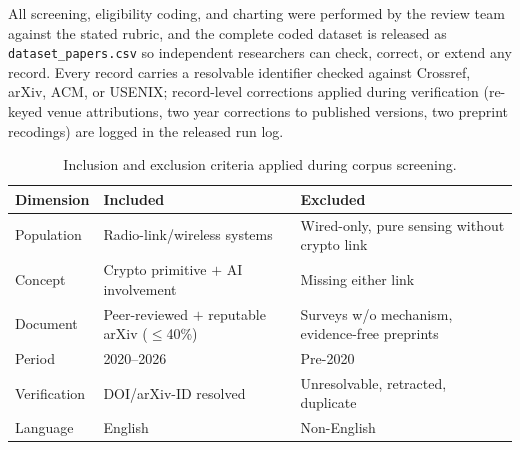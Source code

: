 \documentclass[10.5pt,compsoc,winfonts]{ICN}
\begin{document}
All screening, eligibility coding, and charting were performed by the review team against the stated rubric, and the complete coded dataset is released as \texttt{dataset\_papers.csv} so independent researchers can check, correct, or extend any record. Every record carries a resolvable identifier checked against Crossref, arXiv, ACM, or USENIX; record-level corrections applied during verification (re-keyed venue attributions, two year corrections to published versions, two preprint recodings) are logged in the released run log.

\begin{table}[tbp]
\footnotesize
\centering
\caption{Inclusion and exclusion criteria applied during corpus screening.}
\label{tab:criteria}
\begin{tabular}{@{}p{2.2cm} p{5.5cm} p{6.0cm}@{}}
\toprule
Dimension & Included & Excluded \\
\midrule
Population & Radio-link/wireless systems & Wired-only, pure sensing without crypto link \\
Concept & Crypto primitive $+$ AI involvement & Missing either link \\
Document & Peer-reviewed $+$ reputable arXiv ($\le$40\%) & Surveys w/o mechanism, evidence-free preprints \\
Period & 2020–2026 & Pre-2020 \\
Verification & DOI/arXiv-ID resolved & Unresolvable, retracted, duplicate \\
Language & English & Non-English \\
\bottomrule
\end{tabular}
\end{table}
\end{document}
